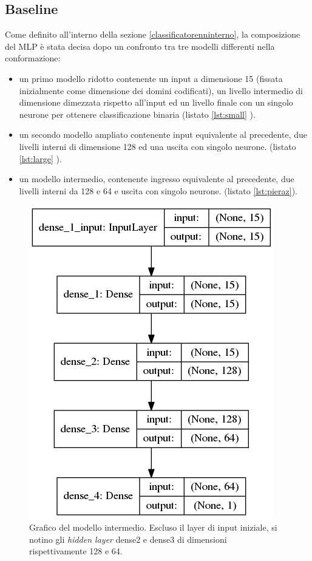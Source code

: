 \subsection{Baseline}
Come definito all'interno della sezione \ref{classificatorenninterno}, la composizione del MLP è stata decisa dopo un confronto tra tre modelli differenti nella conformazione: 

\begin{itemize}
\item un primo modello ridotto contenente un input a dimensione 15 (fissata inizialmente come dimensione dei domini codificati), un livello intermedio di dimensione dimezzata rispetto all'input ed un livello finale con un singolo neurone per ottenere classificazione binaria (listato \ref{lst:small} ). 





\item un secondo modello ampliato contenente input equivalente al precedente, due livelli interni di dimensione 128 ed una uscita con singolo neurone. (listato \ref{lst:large} ).





\item un modello intermedio, contenente ingresso equivalente al precedente, due livelli interni da 128 e 64 e uscita con singolo neurone. (listato \ref{lst:pieraz}).




\end{itemize}

\begin{figure}[!htb]
    \centering
    \includegraphics[width=.6\columnwidth]{figures/pieraz_baseline.png}
    \caption{Grafico del modello intermedio. Escluso il layer di input iniziale, si notino gli \textit{hidden layer} dense2 e dense3 di dimensioni rispettivamente 128 e 64.
\label{fig:pieraz}}
\end{figure}


